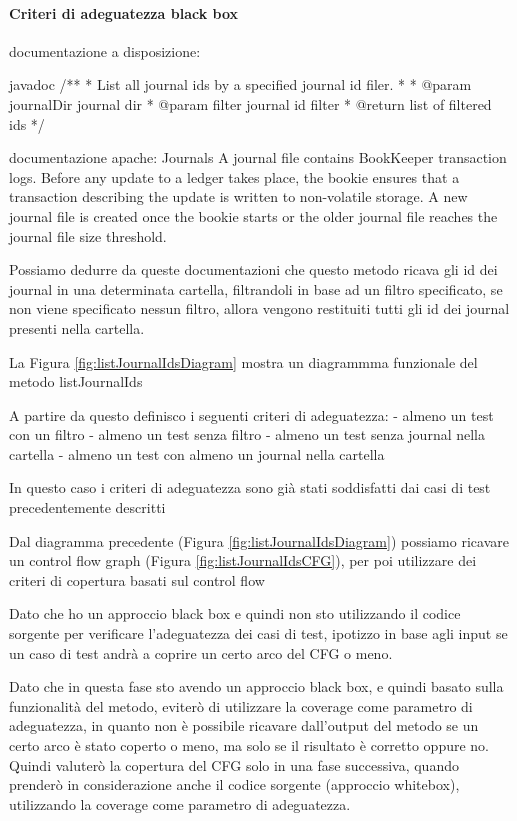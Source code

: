 \documentclass[12pt, a4paper]{article}
\begin{document}
\paragraph{Criteri di adeguatezza black box} 
\par
documentazione a disposizione:

javadoc
/**
* List all journal ids by a specified journal id filer.
*
* @param journalDir journal dir
* @param filter journal id filter
* @return list of filtered ids
*/

 documentazione apache:
 Journals
A journal file contains BookKeeper transaction logs. 
Before any update to a ledger takes place, the bookie ensures that a transaction describing 
the update is written to non-volatile storage. A new journal file is created once the bookie 
starts or the older journal file reaches the journal file size threshold.

Possiamo dedurre da queste documentazioni che questo metodo ricava gli id dei journal in una 
determinata cartella, filtrandoli in base ad un filtro specificato, se non viene specificato 
nessun filtro, allora vengono restituiti tutti gli id dei journal presenti nella cartella.

La Figura \ref{fig:listJournalIdsDiagram} mostra un diagrammma 
funzionale del metodo listJournalIds

A partire da questo definisco i seguenti criteri di adeguatezza:
- almeno un test con un filtro
- almeno un test senza filtro
- almeno un test senza journal nella cartella
- almeno un test con almeno un journal nella cartella

In questo caso i criteri di adeguatezza sono già stati soddisfatti 
dai casi di test precedentemente descritti


Dal diagramma precedente (Figura \ref{fig:listJournalIdsDiagram}) possiamo 
ricavare un control flow graph (Figura \ref{fig:listJournalIdsCFG}), per poi
utilizzare dei criteri di copertura basati sul control flow

Dato che ho un approccio black box e quindi non sto utilizzando il codice sorgente per verificare l'adeguatezza dei casi di test,
ipotizzo in base agli input se un caso di test andrà a coprire un certo arco del CFG o meno.

Dato che in questa fase sto avendo un approccio black box, e quindi basato sulla funzionalità del metodo, 
eviterò di utilizzare la coverage come parametro di adeguatezza, in quanto non è possibile ricavare
dall'output del metodo se un certo arco è stato coperto o meno, ma solo se il risultato è corretto oppure no.
Quindi valuterò la copertura del CFG solo in una fase successiva, quando prenderò in considerazione
anche il codice sorgente (approccio whitebox), utilizzando la coverage come parametro di adeguatezza.
\end{document}
